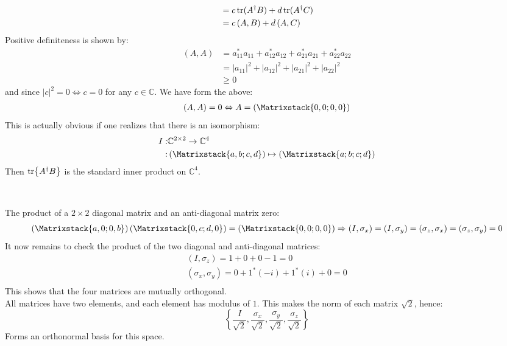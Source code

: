 \documentclass[a4paper,12pt]{article}
\newcommand\rbm[1]{\left(\Matrixstack{#1}\right)}
\begin{document}
\begin{minipage}[t]{0.9\textwidth}
\begin{minipage}[t]{\textwidth}
\begin{align*}
                    &= c\trace(A^\dagger B) + d\trace(A^\dagger C)\\
                    &= c\left(A, B\right) + d\left(A, C\right)
    \end{align*}
    Positive definiteness is shown by:
    \begin{align*}
      \left(A , A \right) &= a_{11}^*a_{11} + a_{12}^*a_{12} + a_{21}^*a_{21} + a_{22}^*a_{22}\\
                          &= |a_{11}|^2 + |a_{12}|^2 + |a_{21}|^2 + |a_{22}|^2\\
                          & \geq 0
    \end{align*}
    and since $|c|^2 = 0 \Leftrightarrow c = 0$ for any $c \in \mathbb{C}$.
    We have form the above:
    \begin{align*}
      \left(A , A \right) = 0 \Leftrightarrow A = \rbm{0, 0; 0,0}
    \end{align*}
    This is actually obvious if one realizes that there is an isomorphism:
    \begin{align*}
      I :& \mathbb{C}^{2 \times 2} \to \mathbb{C}^4\\
        :& \rbm{a, b; c, d} \mapsto \rbm{a; b; c; d}
    \end{align*}
    Then $\tr{A^\dagger B}$ is the standard inner product on $\mathbb{C}^4$.
  \end{minipage}
\end{minipage}

\begin{minipage}[t]{0.9\textwidth}
  $\phantom{\text{b).}}$
  \begin{minipage}[t]{\textwidth}
    The product of a $2\times 2$ diagonal matrix and an anti-diagonal matrix zero:
    \begin{equation*}
      \rbm{a, 0; 0, b} \rbm{0, c; d, 0} = \rbm{0, 0; 0, 0} \Rightarrow (I, \sigma_x) = (I, \sigma_y) = (\sigma_z, \sigma_x) = (\sigma_z, \sigma_y) = 0
    \end{equation*}
    It now remains to check the product of the two diagonal and anti-diagonal matrices:
    \begin{gather*}
      (I, \sigma_z) = 1 + 0 + 0 - 1 = 0\\
      (\sigma_x, \sigma_y) = 0 + 1^* (-i) + 1^*(i) + 0 = 0\\
    \end{gather*}
    This shows that the four matrices are mutually orthogonal.\\

    All matrices have two elements, and each element has modulus of $1$.
    This makes the norm of each matrix $\sqrt{2}$, hence:
    \begin{equation*}
      \left\{\frac{I}{\sqrt{2}}, \frac{\sigma_x}{\sqrt{2}} , \frac{\sigma_y}{\sqrt{2}} , \frac{\sigma_z}{\sqrt{2}} \right\}
    \end{equation*}
    Forms an orthonormal basis for this space.\\
  \end{minipage}
\end{minipage}
\end{document}
